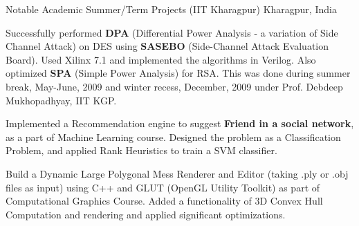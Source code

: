 \begin{cventries}
  \cventry
    {} %
    {Notable Academic Summer/Term Projects (IIT Kharagpur)} %
    {Kharagpur, India} %
    {} %
    { \vspace{-5mm}
      \begin{cvitems} %
        \item {Successfully performed \textbf{DPA} (Differential Power Analysis - a variation of Side Channel Attack) on DES using \textbf{SASEBO} (Side-Channel Attack Evaluation Board). Used Xilinx 7.1 and implemented the algorithms in Verilog. Also optimized \textbf{SPA} (Simple Power Analysis) for RSA. This was done during summer break, May-June, 2009 and winter recess, December, 2009 under Prof. Debdeep Mukhopadhyay, IIT KGP.}
        \item {Implemented a Recommendation engine to suggest \textbf{Friend in a social network}, as a part of Machine Learning course. Designed the problem as a Classification Problem, and applied Rank Heuristics to train a SVM classifier.}
        \item {Build a Dynamic Large Polygonal Mess Renderer and Editor (taking .ply or .obj files as input) using C++ and GLUT (OpenGL Utility Toolkit) as part of Computational Graphics Course. Added a functionality of 3D Convex Hull Computation and rendering and applied significant optimizations.}
      \end{cvitems}
    }

\end{cventries}
